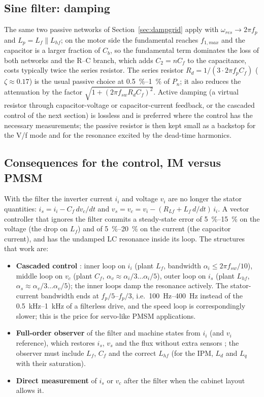 \documentclass[10pt,a4paper]{scrartcl}
\newcommand{\fsw}{f_{sw}}
\newcommand{\wres}{\omega_{res}}
\newcommand{\Lhf}{L_{hf}}
\newcommand{\Cf}{C_{f}}
\newcommand{\Lf}{L_{f}}
\begin{document}
\begin{onehalfspace}
\subsection{Sine filter: damping}
\label{sec:dampmotor}
The same two passive networks of Section~\ref{sec:dampgrid} apply with $\wres \to 2\pi f_p$ and $L_p = \Lf \parallel \Lhf$; on the motor side the fundamental reaches $f_{1,max}$ and the capacitor is a larger fraction of $C_b$, so the fundamental term dominates the loss of both networks and the R--C branch, which adds $C_2 = n\Cf$ to the capacitance, costs typically twice the series resistor. The series resistor $R_d = 1/(3\cdot 2\pi f_p \Cf)$ ($\zeta \approx 0.17$) is the usual passive choice at \SIrange{0.5}{1}{\percent} of $P_n$; it also reduces the attenuation by the factor $\sqrt{1 + (2\pi\fsw R_d \Cf)^2}$. Active damping (a virtual resistor through capacitor-voltage or capacitor-current feedback, or the cascaded control of the next section) is lossless and is preferred where the control has the necessary measurements; the passive resistor is then kept small as a backstop for the V/f mode and for the resonance excited by the dead-time harmonics.

\subsection{Consequences for the control, IM versus PMSM}
\label{sec:control}
With the filter the inverter current $i_i$ and voltage $v_i$ are no longer the stator quantities: $i_s = i_i - \Cf\,dv_c/dt$ and $v_s = v_c = v_i - (R_{Lf} + \Lf\,d/dt)\,i_i$. A vector controller that ignores the filter commits a steady-state error of \SIrange{5}{15}{\percent} on the voltage (the drop on $\Lf$) and of \SIrange{5}{20}{\percent} on the current (the capacitor current), and has the undamped LC resonance inside its loop. The structures that work are:
\begin{itemize}
\item \textbf{Cascaded control} \cite{salomaki2006}: inner loop on $i_i$ (plant $\Lf$, bandwidth $\alpha_i \le 2\pi\fsw/10$), middle loop on $v_c$ (plant $\Cf$, $\alpha_v \approx \alpha_i/3 \ldots \alpha_i/5$), outer loop on $i_s$ (plant $\Lhf$, $\alpha_s \approx \alpha_v/3 \ldots \alpha_v/5$); the inner loops damp the resonance actively. The stator-current bandwidth ends at $f_p/5$--$f_p/3$, i.e.\ \SIrange{100}{400}{Hz} instead of the \SIrange{0.5}{1}{kHz} of a filterless drive, and the speed loop is correspondingly slower; this is the price for servo-like PMSM applications.
\item \textbf{Full-order observer} of the filter and machine states from $i_i$ (and $v_i$ reference), which restores $i_s$, $v_s$ and the flux without extra sensors \cite{salomaki2006,salomaki2006b}; the observer must include $\Lf$, $\Cf$ and the correct $\Lhf$ (for the IPM, $L_d$ and $L_q$ with their saturation).
\item \textbf{Direct measurement} of $i_s$ or $v_c$ after the filter when the cabinet layout allows it.
\end{itemize}


\end{onehalfspace}
\end{document}
